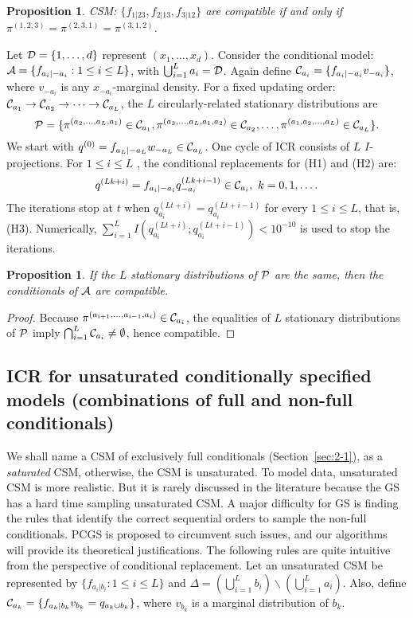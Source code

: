 \documentclass[12pt,a4paper]{article}
\newtheorem{proposition}[definition]{Proposition}
\begin{document}
\begin{proposition}
CSM: $\{f_{1|23}, f_{2|13}, f_{3|12}\}$ are compatible if and only if $\pi^{(1,2,3)} =\pi^{(2,3,1)}=\pi^{(3,1,2)}$.
\end{proposition}

Let ${\cal D}=\{1,\ldots,d\}$ represent $(x_1,\ldots,x_d)$.  Consider the conditional model:
${\cal A}=\{ f_{a_i|-a_i}: 1 \le i \le L\}$, with  $\bigcup_{i=1}^L a_i={\cal D}$.
Again define ${\cal C}_{a_i}=\{f_{a_i|-a_i} v_{-a_i} \}$, where $v_{-a_i}$ is any $x_{-a_i}$-marginal density.
For a fixed updating order: ${\cal C}_{a_1} \to {\cal C}_{a_2}\to \cdots \to {\cal C}_{a_L}$,  the $L$ circularly-related stationary distributions are
\[{\cal P}=\{\pi^{(a_2,\ldots,a_L,a_1)} \in {\cal C}_{a_1},
\pi^{(a_3,\ldots,a_L,a_1,a_2)} \in {\cal C}_{a_2}, \ldots, \pi^{(a_1,a_2,\ldots,a_L)} \in {\cal C}_{a_L}\}.\]
We start with $q^{(0)}= f_{a_L|-a_L} w_{-a_L} \in {\cal C}_{a_L}$.
One cycle of ICR consists of $L$ $I$-projections.  For $1 \le i \le L$ , the conditional replacements for (H1) and (H2) are:
\[q^{(Lk+i)}= f_{a_i|-a_i} q^{(Lk+i-1)}_{-a_i} \in {\cal C}_{a_i},\ k=0,1,\ldots.\]
The iterations stop at $t$ when $q^{(Lt+i)}_{a_i}=q^{(Lt+i-1)}_{a_i}$ for every $1\le i \le L$, that is, (H3).
Numerically, $\sum_{i=1}^{L} I(q_{a_i}^{(Lt+i)};q_{a_i}^{(Lt+i-1)}) < 10^{-10}$ is used to stop the iterations.

\begin{proposition}
If the $L$ stationary distributions
of ${\cal P}$ are the same, then the conditionals of ${\cal A}$ are compatible.
\end{proposition}
\begin{proof}
Because $\pi^{(a_{i+1},\ldots,a_{i-1},a_i)} \in {\cal C}_{a_i}$, the equalities of $L$ stationary distributions of ${\cal P}$ imply $\bigcap_{i=1}^{L}{\cal C}_{a_i} \ne \emptyset$, hence compatible.
\end{proof}

\subsection{ICR for unsaturated conditionally specified models (combinations of full and non-full conditionals)}\label{sec:2-2}
We shall name a CSM of exclusively full conditionals (Section~\ref{sec:2-1}), as a \emph{saturated} CSM, otherwise, the CSM is unsaturated. To model data, unsaturated CSM is more realistic.
But it is rarely discussed in the literature because the GS has a hard time sampling unsaturated CSM.
A major difficulty for GS  is finding the rules that identify the correct sequential orders to sample the non-full conditionals.
PCGS \citep{vanDyk2008}  is proposed to circumvent such issues, and  our algorithms will provide its theoretical justifications.
The following rules are quite intuitive from the perspective of conditional replacement.
Let an unsaturated CSM be represented by $\{f_{a_i|b_i}: 1 \le i \le L\}$ and  $\Delta=(\bigcup_{i=1}^{L} b_i) \backslash (\bigcup_{i=1}^{L} a_i)$.
Also, define ${\cal C}_{a_k}=\{f_{a_k|b_k} v_{b_k}=q_{a_k \cup b_k}\}$, where $v_{b_k}$ is a marginal distribution of $b_k$.
\end{document}

